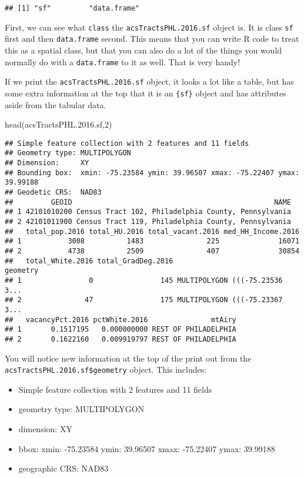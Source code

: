 \documentclass[
]{article}
\newenvironment{Shaded}{\begin{snugshade}}{\end{snugshade}}
\newcommand{\DecValTok}[1]{\textcolor[rgb]{0.00,0.00,0.81}{#1}}
\newcommand{\FloatTok}[1]{\textcolor[rgb]{0.00,0.00,0.81}{#1}}
\newcommand{\FunctionTok}[1]{\textcolor[rgb]{0.00,0.00,0.00}{#1}}
\newcommand{\NormalTok}[1]{#1}
\providecommand{\tightlist}{%
  \setlength{\itemsep}{0pt}\setlength{\parskip}{0pt}}
\begin{document}
\begin{verbatim}
## [1] "sf"         "data.frame"
\end{verbatim}

First, we can see what \texttt{class} the \texttt{acsTractsPHL.2016.sf}
object is. It is class \texttt{sf} first and then \texttt{data.frame}
second. This means that you can write R code to treat this as a spatial
class, but that you can also do a lot of the things you would normally
do with a \texttt{data.frame} to it as well. That is very handy!

If we print the \texttt{acsTractsPHL.2016.sf} object, it looks a lot
like a table, but has some extra information at the top that it is an
\texttt{\{sf\}} object and has attributes aside from the tabular data.

\begin{Shaded}
\begin{Highlighting}[]
\FunctionTok{head}\NormalTok{(acsTractsPHL.}\FloatTok{2016.}\NormalTok{sf,}\DecValTok{2}\NormalTok{)}
\end{Highlighting}
\end{Shaded}

\begin{verbatim}
## Simple feature collection with 2 features and 11 fields
## Geometry type: MULTIPOLYGON
## Dimension:     XY
## Bounding box:  xmin: -75.23584 ymin: 39.96507 xmax: -75.22407 ymax: 39.99188
## Geodetic CRS:  NAD83
##         GEOID                                                NAME
## 1 42101010200 Census Tract 102, Philadelphia County, Pennsylvania
## 2 42101011900 Census Tract 119, Philadelphia County, Pennsylvania
##   total_pop.2016 total_HU.2016 total_vacant.2016 med_HH_Income.2016
## 1           3008          1483               225              16071
## 2           4738          2509               407              30854
##   total_White.2016 total_GradDeg.2016                       geometry
## 1                0                145 MULTIPOLYGON (((-75.23536 3...
## 2               47                175 MULTIPOLYGON (((-75.23367 3...
##   vacancyPct.2016 pctWhite.2016               mtAiry
## 1       0.1517195   0.000000000 REST OF PHILADELPHIA
## 2       0.1622160   0.009919797 REST OF PHILADELPHIA
\end{verbatim}

You will notice new information at the top of the print out from the
\texttt{acsTractsPHL.2016.sf\$geometry} object. This includes:

\begin{itemize}
\tightlist
\item
  Simple feature collection with 2 features and 11 fields
\item
  geometry type: MULTIPOLYGON
\item
  dimension: XY
\item
  bbox: xmin: -75.23584 ymin: 39.96507 xmax: -75.22407 ymax: 39.99188
\item
  geographic CRS: NAD83
\end{itemize}
\end{document}
